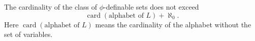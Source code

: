 The cardinality of the class of $\phi$-definable sets does not exceed
$$\operatorname{card}(\text{alphabet of } L) + \aleph_0.$$
Here $\operatorname{card}(\text{alphabet of } L)$ means the cardinality of the alphabet without the set of variables.
